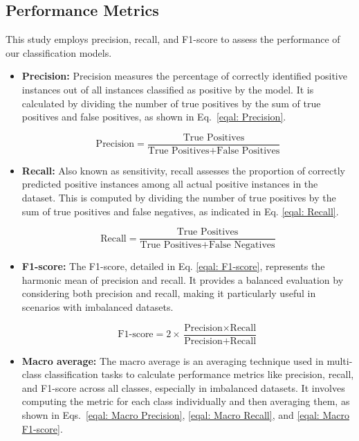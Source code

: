 \documentclass[conference, 10pt,onecolumn]{IEEEtran}
\begin{document}
\subsection{Performance Metrics}
This study employs precision, recall, and F1-score to assess the performance of our classification models.
\begin{itemize}
\item \textbf{Precision:} Precision measures the percentage of correctly identified positive instances out of all instances classified as positive by the model. It is calculated by dividing the number of true positives by the sum of true positives and false positives, as shown in Eq.~\ref{eqal: Precision}.

\begin{equation}
     \text{Precision} = \frac{\text{True Positives}}{\text{True Positives} + \text{False Positives}} 
     \label{eqal: Precision}
\end{equation}

\item \textbf{Recall:} Also known as sensitivity, recall assesses the proportion of correctly predicted positive instances among all actual positive instances in the dataset. This is computed by dividing the number of true positives by the sum of true positives and false negatives, as indicated in Eq. \ref{eqal: Recall}.

\begin{equation}
    \text{Recall} = \frac{\text{True Positives}}{\text{True Positives} + \text{False Negatives}}
    \label{eqal: Recall}
\end{equation}

\item \textbf{F1-score:} The F1-score, detailed in Eq. \ref{eqal: F1-score}, represents the harmonic mean of precision and recall. It provides a balanced evaluation by considering both precision and recall, making it particularly useful in scenarios with imbalanced datasets.

\begin{equation}
    \text{F1-score} = 2 \times \frac{\text{Precision} \times \text{Recall}}{\text{Precision} + \text{Recall}}
    \label{eqal: F1-score}
\end{equation}

\item \textbf{Macro average:} The macro average is an averaging technique used in multi-class classification tasks to calculate performance metrics like precision, recall, and F1-score across all classes, especially in imbalanced datasets. It involves computing the metric for each class individually and then averaging them, as shown in Eqs.~\ref{eqal: Macro Precision}, \ref{eqal: Macro Recall}, and \ref{eqal: Macro F1-score}.


\end{itemize}
\end{document}
